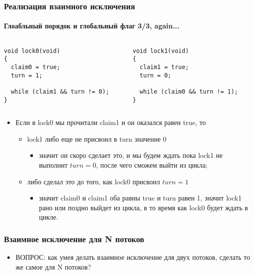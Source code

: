 \begin{frame}[fragile]
\frametitle{Реализация взаимного исключения}
\framesubtitle{Глоабльный порядок и глобальный флаг 3/3, again...}
\begin{columns}
  \begin{column}{.45\linewidth}
    \begin{lstlisting}
void lock0(void)
{
  claim0 = true;
  turn = 1;

  while (claim1 && turn != 0);
}
    \end{lstlisting}
  \end{column}
  \begin{column}{.45\linewidth}
    \begin{lstlisting}
void lock1(void)
{
  claim1 = true;
  turn = 0;

  while (claim0 && turn != 1);
}
    \end{lstlisting}
  \end{column}
\end{columns}
\begin{itemize}
  \item Если в lock0 мы прочитали claim1 и он оказался равен true, то
  \begin{itemize}
    \item lock1 либо еще не присвоил в turn значение 0
    \begin{itemize}
      \item значит он скоро сделает это, и мы будем ждать пока lock1 не выполнит
      $turn = 0$, после чего сможем выйти из цикла;
    \end{itemize}
    \item либо сделал это до того, как lock0 присвоил $turn = 1$
    \begin{itemize}
      \item значит claim0 и claim1 оба равны true и turn равен 1, значит lock1
      рано или поздно выйдет из цикла, в то время как lock0 будет ждать в цикле.
    \end{itemize}
  \end{itemize}
\end{itemize}
\end{frame}

\begin{frame}
\frametitle{Взаимное исключение для N потоков}
\begin{itemize}
  \item ВОПРОС: как умея делать взаимное исключение для двух потоков, сделать
  то же самое для N потоков?
\end{itemize}
\end{frame}

